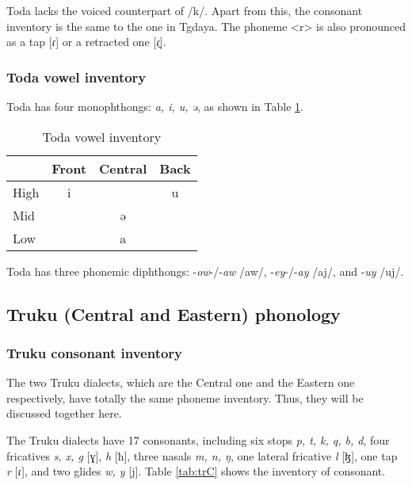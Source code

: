 \documentclass[12pt]{article}
\newcommand{\stgf}{Tgdaya\xspace}
\newcommand{\stof}{Toda\xspace}
\begin{document}
\stof lacks the voiced counterpart of /k/. Apart from this, the consonant inventory is the same to the one in \stgf. The phoneme <r> is also pronounced as a tap [ɾ] or a retracted one [ɾ̠]. 

\subsubsection{Toda vowel inventory}

\stof has four monophthongs: \textit{a, i, u, ə}, as shown in Table \ref{tab:toV}.

\begin{table}[!htbp]
\centering
\caption{Toda vowel inventory}
\label{tab:toV}
\begin{tabular}{lccc}
\hline
     & Front & Central & Back \\ \hline
High &  i    &         &  u   \\
Mid  &       &  ə      &      \\
Low  &       &  a      &      \\ \hline
\end{tabular}
\end{table}

\stof has three phonemic diphthongs: -\textit{ow}-/-\textit{aw} /aw/, -\textit{ey}-/-\textit{ay} /aj/, and -\textit{uy} /uj/. 

\subsection{Truku (Central and Eastern) phonology}

\subsubsection{Truku consonant inventory}

The two Truku dialects, which are the Central one and the Eastern one respectively, have totally the same phoneme inventory. Thus, they will be discussed together here. 

The Truku dialects have 17 consonants, including six stops \textit{p, t, k, q, b, d}, four fricatives \textit{s, x, g} [ɣ], \textit{h} [ħ], three nasals \textit{m, n, ŋ}, one lateral fricative \textit{l} [ɮ], one tap \textit{r} [ɾ], and two glides \textit{w, y} [j]. Table \ref{tab:trC} shows the inventory of consonant.
\end{document}
